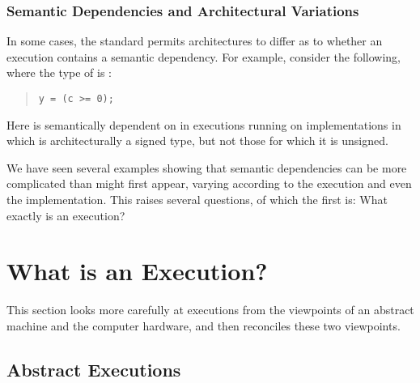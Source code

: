 \subsubsection{Semantic Dependencies and Architectural Variations}
\label{sec:Semantic Dependencies and Architectural Variations}

In some cases, the standard permits architectures to differ as to whether
an execution contains a semantic dependency.
For example, consider the following, where the type of  is :
\begin{quote}
\begin{verbatim}
y = (c >= 0);
\end{verbatim}
\end{quote}
Here  is semantically dependent on  in executions
running on implementations in
which  is architecturally a signed type,
but not those for which it is unsigned.

We have seen several examples showing that semantic dependencies can
be more complicated than might first appear, varying according to the
execution and even the implementation.
This raises several questions, of which the first is:
What exactly is an execution?

\section{What is an Execution?}
\label{sec:What is an Execution?}

This section looks more carefully at executions from the viewpoints of
an abstract machine and the computer hardware, and then reconciles
these two viewpoints.

\subsection{Abstract Executions}
\label{sec:Abstract Executions}

